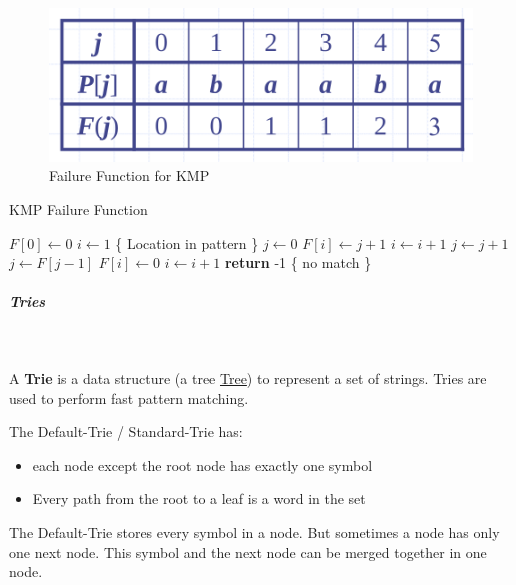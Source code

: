 \documentclass[11pt,twoside,twocolumn,landscape]{article}
\begin{document}
\begin{figure}[htbp]
\centering
\includegraphics[width=.9\linewidth]{img/kmp_failure_function.png}
\caption{\label{fig:orgd957d8b}Failure Function for KMP}
\end{figure}


\begin{algorithm}
  \caption{KMP Failure Function}
  \begin{algorithmic}[1]
    \State $F[0] \leftarrow 0$
    \State $i \leftarrow 1$ \{ Location in pattern \}
    \State $j \leftarrow 0$ 
    \State $F[i] \leftarrow  j + 1$
    \State $i \leftarrow i + 1$
    \State $j \leftarrow j + 1$
    \State $j \leftarrow F[j-1]$
    \Else
    \State $F[i] \leftarrow 0$
    \State $i \leftarrow i + 1$
    \EndIf
    \EndWhile
    \textbf{return} -1 \{ no match \}
    \EndProcedure
  \end{algorithmic}
\end{algorithm}

\subparagraph{Tries} \
\label{sec:orgdfbc178}

A \textbf{Trie} is a data structure (a tree \href{../../../roam/20210806224741-tree.org}{Tree}) to represent a set of strings.
Tries are used to perform fast pattern matching.


The Default-Trie / Standard-Trie has:
\begin{itemize}
\item each node except the root node has exactly one symbol
\item Every path from the root to a leaf is a word in the set
\end{itemize}


The Default-Trie stores every symbol in a node.
But sometimes a node has only one next node.
This symbol and the next node can be merged together in one node.
\end{document}
